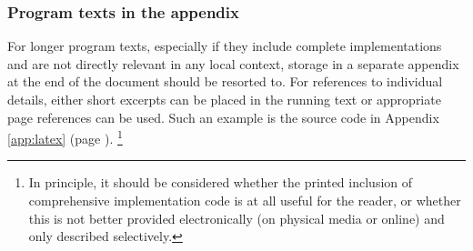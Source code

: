 \subsubsection{Program texts in the appendix}

For longer program texts, especially if they include complete implementations
and are not directly relevant in any local context, storage in a separate
appendix at the end of the document should be resorted to. For references to
individual details, either short excerpts can be placed in the running text
or appropriate page references can be used. Such an example is the \latex
source code in Appendix \ref{app:latex} (page \pageref{app:latex}).%
\footnote{In principle, it should be considered whether the printed inclusion
of comprehensive implementation code is at all useful for the reader, or
whether this is not better provided electronically (on physical media or
online) and only described selectively.}


\clearpage
\listoftables
